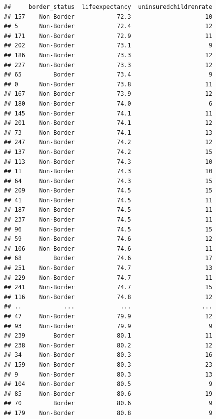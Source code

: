 \documentclass[]{article}
\begin{document}
\begin{verbatim}
##     border_status  lifeexpectancy  uninsuredchildrenrate
## 157    Non-Border            72.3                     10
## 5      Non-Border            72.4                     12
## 171    Non-Border            72.9                     11
## 202    Non-Border            73.1                      9
## 186    Non-Border            73.3                     12
## 227    Non-Border            73.3                     12
## 65         Border            73.4                      9
## 0      Non-Border            73.8                     11
## 167    Non-Border            73.9                     12
## 180    Non-Border            74.0                      6
## 145    Non-Border            74.1                     11
## 201    Non-Border            74.1                     12
## 73     Non-Border            74.1                     13
## 247    Non-Border            74.2                     12
## 137    Non-Border            74.2                     15
## 113    Non-Border            74.3                     10
## 11     Non-Border            74.3                     10
## 64     Non-Border            74.3                     15
## 209    Non-Border            74.5                     15
## 41     Non-Border            74.5                     11
## 187    Non-Border            74.5                     11
## 237    Non-Border            74.5                     11
## 96     Non-Border            74.5                     15
## 59     Non-Border            74.6                     12
## 106    Non-Border            74.6                     11
## 68         Border            74.6                     17
## 251    Non-Border            74.7                     13
## 229    Non-Border            74.7                     11
## 241    Non-Border            74.7                     15
## 116    Non-Border            74.8                     12
## ..            ...             ...                    ...
## 47     Non-Border            79.9                     12
## 93     Non-Border            79.9                      9
## 239        Border            80.1                     11
## 238    Non-Border            80.2                     12
## 34     Non-Border            80.3                     16
## 159    Non-Border            80.3                     23
## 9      Non-Border            80.3                     13
## 104    Non-Border            80.5                      9
## 85     Non-Border            80.6                     19
## 70         Border            80.6                      9
## 179    Non-Border            80.8                      9

\end{verbatim}
\end{document}
